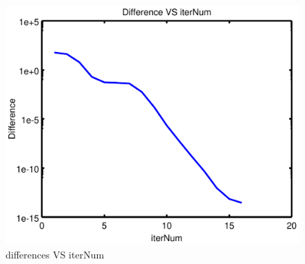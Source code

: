 \documentclass[12pt,oneside,a4paper]{article}
\begin{document}
\begin{figure}[!ht]
  \centering
  \includegraphics[scale=0.5]{./code/p2-crop.pdf}
  \caption{differences VS iterNum}
  \label{graph2}
\end{figure}
\end{document}
